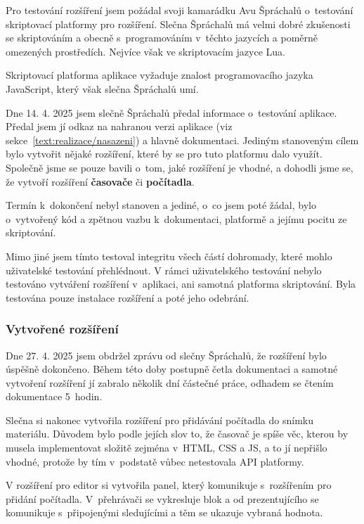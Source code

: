 Pro testování rozšíření jsem požádal svoji kamarádku Avu Špráchalů o~testování skriptovací platformy pro rozšíření.
Slečna Špráchalů má velmi dobré zkušenosti se skriptováním a obecně s~programováním v~těchto jazycích a poměrně omezených prostředích.
Nejvíce však ve skriptovacím jazyce Lua.

Skriptovací platforma aplikace vyžaduje znalost programovacího jazyka JavaScript, který však slečna Špráchalů umí.

Dne 14. 4. 2025 jsem slečně Špráchalů předal informace o~testování aplikace.
Předal jsem jí odkaz na nahranou verzi aplikace (viz sekce~\ref{text:realizace/nasazeni}) a hlavně dokumentaci.
Jediným stanoveným cílem bylo vytvořit nějaké rozšíření, které by se pro tuto platformu dalo využít.
Společně jsme se pouze bavili o~tom, jaké rozšíření je vhodné, a dohodli jsme se, že vytvoří rozšíření \textbf{časovače} či \textbf{počítadla}.

Termín k~dokončení nebyl stanoven a jediné, o~co jsem poté žádal, bylo o~vytvořený kód a zpětnou vazbu k~dokumentaci, platformě a jejímu pocitu ze skriptování.

Mimo jiné jsem tímto testoval integritu všech částí dohromady, které mohlo uživatelské testování přehlédnout.
V rámci uživatelského testování nebylo testováno vytváření rozšíření v~aplikaci, ani samotná platforma skriptování. 
Byla testována pouze instalace rozšíření a poté jeho odebrání.

\subsubsection{Vytvořené rozšíření}

Dne 27. 4. 2025 jsem obdržel zprávu od slečny Špráchalů, že rozšíření bylo úspěšně dokončeno.
Během této doby postupně četla dokumentaci a samotné vytvoření rozšíření jí zabralo několik dní částečné práce, odhadem se čtením dokumentace 5~hodin.

Slečna si nakonec vytvořila rozšíření pro přidávání počítadla do snímku materiálu.
Důvodem bylo podle jejích slov to, že časovač je spíše věc, kterou by musela implementovat složitě zejména v~HTML, CSS a JS, a to jí nepřišlo vhodné, protože by tím v~podstatě vůbec netestovala API platformy.

V rozšíření pro editor si vytvořila panel, který komunikuje s~rozšířením pro přidání počítadla. V~přehrávači se vykresluje blok a od prezentujícího se komunikuje s~připojenými sledujícími a těm se ukazuje vybraná hodnota.

